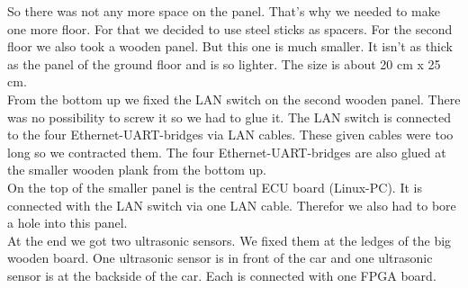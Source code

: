 So there was not any more space on the panel. That's why we needed to make one more floor. For that we decided to use steel sticks as spacers. For the second floor we also took a wooden panel. But this one is much smaller. It isn't as thick as the panel of the ground floor and is so lighter. The size is about 20 cm x 25 cm.\\

From the bottom up we fixed the LAN switch on the second wooden panel. There was no possibility to screw it so we had to glue it. The LAN switch is connected to the four Ethernet-UART-bridges via LAN cables. These given cables were too long so we contracted them. The four Ethernet-UART-bridges are also glued at the smaller wooden plank from the bottom up.\\

On the top of the smaller panel is the central ECU board (Linux-PC). It is connected with the LAN switch via one LAN cable. Therefor we also had to bore a hole into this panel.\\

At the end we got two ultrasonic sensors. We fixed them at the ledges of the big wooden board. One ultrasonic sensor is in front of the car and one ultrasonic sensor is at the backside of the car. Each 
is connected with one FPGA board. 